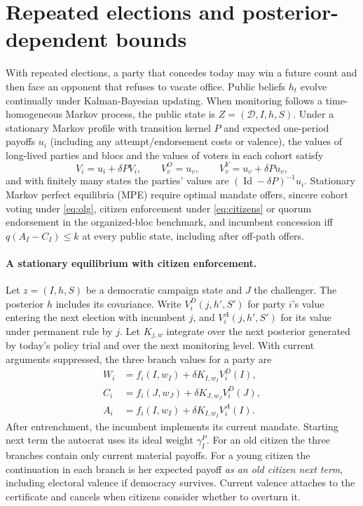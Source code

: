 \documentclass[11pt,letterpaper]{article}
\newcommand{\Id}{\operatorname{Id}}
\begin{document}
\section{Repeated elections and posterior-dependent bounds}\label{sec:stationary}

With repeated elections, a party that concedes today may win a future count and then face an opponent that refuses to vacate office. Public beliefs $h_t$ evolve continually under Kalman-Bayesian updating. When monitoring follows a time-homogeneous Markov process, the public state is $Z=(\mathcal D,I,h,S)$. Under a stationary Markov profile with transition kernel $P$ and expected one-period payoffs $u_i$ (including any attempt/endorsement costs or valence), the values of long-lived parties and blocs and the values of voters in each cohort satisfy
\begin{equation}
 V_i=u_i+\delta PV_i,\qquad V_v^O=u_v,\qquad
 V_v^Y=u_v+\delta P u_v ,
 \label{eq:bellman}
\end{equation}
and with finitely many states the parties' values are $(\Id-\delta P)^{-1}u_i$. Stationary Markov perfect equilibria (MPE) require optimal mandate offers, sincere cohort voting under \eqref{eq:olg}, citizen enforcement under \eqref{eq:citizens} or quorum endorsement in the organized-bloc benchmark, and incumbent concession iff $q(A_I-C_I)\le k$ at every public state, including after off-path offers.

\paragraph{A stationary equilibrium with citizen enforcement.}
Let $z=(I,h,S)$ be a democratic campaign state and $J$ the challenger. The posterior $h$ includes its covariance. Write $V_i^D(j,h',S')$ for party $i$'s value entering the next election with incumbent $j$, and $V_i^A(j,h',S')$ for its value under permanent rule by $j$. Let $K_{j,w}$ integrate over the next posterior generated by today's policy trial and over the next monitoring level. With current arguments suppressed, the three branch values for a party are
\begin{equation}
 \begin{aligned}
 W_i&= f_i(I,w_I)+\delta K_{I,w_I}V_i^D(I),\\
 C_i&= f_i(J,w_J)+\delta K_{J,w_J}V_i^D(J),\\
 A_i&= f_i(I,w_I)+\delta K_{I,w_I}V_i^A(I).
 \end{aligned}\label{eq:stationarybranches}
\end{equation}
After entrenchment, the incumbent implements its current mandate. Starting next term the autocrat uses its ideal weight $\gamma_I^P$. For an old citizen the three branches contain only current material payoffs. For a young citizen the continuation in each branch is her expected payoff \emph{as an old citizen next term}, including electoral valence if democracy survives. Current valence attaches to the certificate and cancels when citizens consider whether to overturn it.
\end{document}
